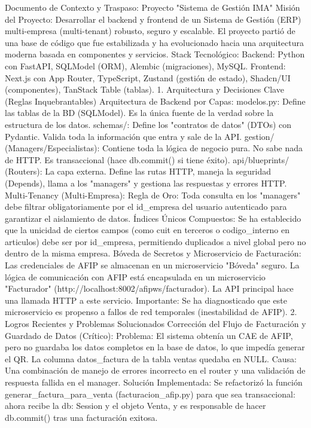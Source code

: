 Documento de Contexto y Traspaso: Proyecto "Sistema de Gestión IMA"
Misión del Proyecto: Desarrollar el backend y frontend de un Sistema de Gestión (ERP) multi-empresa (multi-tenant) robusto, seguro y escalable. El proyecto partió de una base de código que fue estabilizada y ha evolucionado hacia una arquitectura moderna basada en componentes y servicios.
Stack Tecnológico:
Backend: Python con FastAPI, SQLModel (ORM), Alembic (migraciones), MySQL.
Frontend: Next.js con App Router, TypeScript, Zustand (gestión de estado), Shadcn/UI (componentes), TanStack Table (tablas).
1. Arquitectura y Decisiones Clave (Reglas Inquebrantables)
Arquitectura de Backend por Capas:
modelos.py: Define las tablas de la BD (SQLModel). Es la única fuente de la verdad sobre la estructura de los datos.
schemas/: Define los "contratos de datos" (DTOs) con Pydantic. Valida toda la información que entra y sale de la API.
gestion/ (Managers/Especialistas): Contiene toda la lógica de negocio pura. No sabe nada de HTTP. Es transaccional (hace db.commit() si tiene éxito).
api/blueprints/ (Routers): La capa externa. Define las rutas HTTP, maneja la seguridad (Depends), llama a los "managers" y gestiona las respuestas y errores HTTP.
Multi-Tenancy (Multi-Empresa):
Regla de Oro: Toda consulta en los "managers" debe filtrar obligatoriamente por el id_empresa del usuario autenticado para garantizar el aislamiento de datos.
Índices Únicos Compuestos: Se ha establecido que la unicidad de ciertos campos (como cuit en terceros o codigo_interno en articulos) debe ser por id_empresa, permitiendo duplicados a nivel global pero no dentro de la misma empresa.
Bóveda de Secretos y Microservicio de Facturación:
Las credenciales de AFIP se almacenan en un microservicio "Bóveda" seguro.
La lógica de comunicación con AFIP está encapsulada en un microservicio "Facturador" (http://localhost:8002/afipws/facturador). La API principal hace una llamada HTTP a este servicio.
Importante: Se ha diagnosticado que este microservicio es propenso a fallos de red temporales (inestabilidad de AFIP).
2. Logros Recientes y Problemas Solucionados
Corrección del Flujo de Facturación y Guardado de Datos (Crítico):
Problema: El sistema obtenía un CAE de AFIP, pero no guardaba los datos completos en la base de datos, lo que impedía generar el QR. La columna datos_factura de la tabla ventas quedaba en NULL.
Causa: Una combinación de manejo de errores incorrecto en el router y una validación de respuesta fallida en el manager.
Solución Implementada:
Se refactorizó la función generar_factura_para_venta (facturacion_afip.py) para que sea transaccional: ahora recibe la db: Session y el objeto Venta, y es responsable de hacer db.commit() tras una facturación exitosa.
